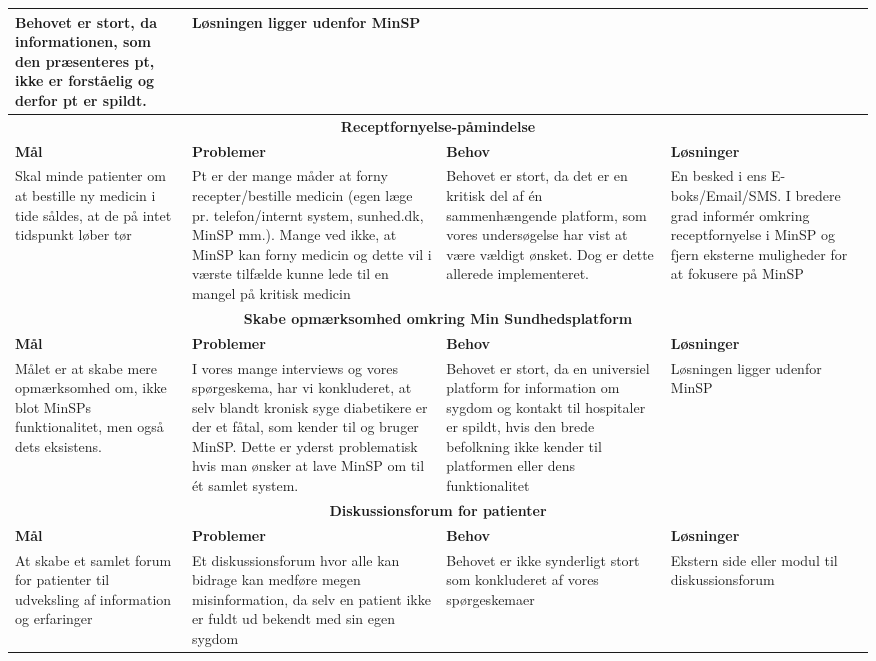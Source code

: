 \begin{tabularx}{\textwidth}{|X|X|X|X|}
	Behovet er stort, da informationen, som den præsenteres pt, ikke er forståelig og derfor pt er spildt.&
	Løsningen ligger udenfor MinSP\\
	\hline
	\multicolumn{4}{|c|}{\textbf{Receptfornyelse-påmindelse}}\\
	\hline
	\textbf{Mål} & \textbf{Problemer} & \textbf{Behov} & \textbf{Løsninger}\\
	\hline
	Skal minde patienter om at bestille ny medicin i tide såldes, at de på intet tidspunkt løber tør&
	Pt er der mange måder at forny recepter/bestille medicin (egen læge pr. telefon/internt system, sunhed.dk, MinSP mm.). Mange ved ikke, at MinSP kan forny medicin og dette vil i værste tilfælde kunne lede til en mangel på kritisk medicin&
	Behovet er stort, da det er en kritisk del af én sammenhængende platform, som vores undersøgelse har vist at være vældigt ønsket. Dog er dette allerede implementeret.&
	En besked i ens E-boks/Email/SMS. I bredere grad informér omkring receptfornyelse i MinSP og fjern eksterne muligheder for at fokusere på MinSP\\
	\hline
	\multicolumn{4}{|c|}{\textbf{Skabe opmærksomhed omkring Min Sundhedsplatform}}\\
	\hline
	\textbf{Mål} & \textbf{Problemer} & \textbf{Behov} & \textbf{Løsninger}\\
	\hline
	Målet er at skabe mere opmærksomhed om, ikke blot MinSPs funktionalitet, men også dets eksistens.&
	I vores mange interviews og vores spørgeskema, har vi konkluderet, at selv blandt kronisk syge diabetikere er der et fåtal, som kender til og bruger MinSP. Dette er yderst problematisk hvis man ønsker at lave MinSP om til ét samlet system.&
	Behovet er stort, da en universiel platform for information om sygdom og kontakt til hospitaler er spildt, hvis den brede befolkning ikke kender til platformen eller dens funktionalitet&
	Løsningen ligger udenfor MinSP\\
	\hline
	\multicolumn{4}{|c|}{\textbf{Diskussionsforum for patienter}}\\
	\hline
	\textbf{Mål} & \textbf{Problemer} & \textbf{Behov} & \textbf{Løsninger}\\
	\hline
	At skabe et samlet forum for patienter til udveksling af information og erfaringer&
	Et diskussionsforum hvor alle kan bidrage kan medføre megen misinformation, da selv en patient ikke er fuldt ud bekendt med sin egen sygdom&
	Behovet er ikke synderligt stort som konkluderet af vores spørgeskemaer&
	Ekstern side eller modul til diskussionsforum\\
	\hline
\end{tabularx}
